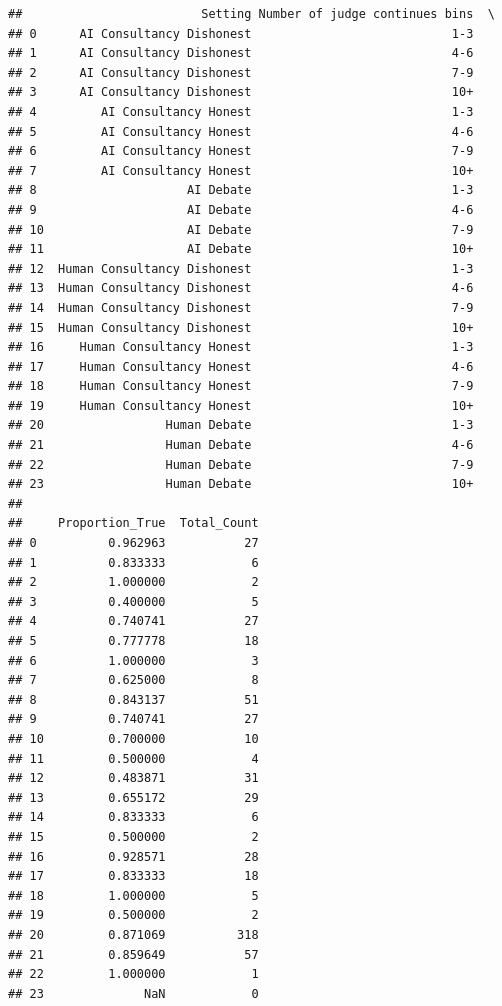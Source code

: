 \documentclass[
]{article}
\begin{document}
\begin{verbatim}
##                         Setting Number of judge continues bins  \
## 0      AI Consultancy Dishonest                            1-3   
## 1      AI Consultancy Dishonest                            4-6   
## 2      AI Consultancy Dishonest                            7-9   
## 3      AI Consultancy Dishonest                            10+   
## 4         AI Consultancy Honest                            1-3   
## 5         AI Consultancy Honest                            4-6   
## 6         AI Consultancy Honest                            7-9   
## 7         AI Consultancy Honest                            10+   
## 8                     AI Debate                            1-3   
## 9                     AI Debate                            4-6   
## 10                    AI Debate                            7-9   
## 11                    AI Debate                            10+   
## 12  Human Consultancy Dishonest                            1-3   
## 13  Human Consultancy Dishonest                            4-6   
## 14  Human Consultancy Dishonest                            7-9   
## 15  Human Consultancy Dishonest                            10+   
## 16     Human Consultancy Honest                            1-3   
## 17     Human Consultancy Honest                            4-6   
## 18     Human Consultancy Honest                            7-9   
## 19     Human Consultancy Honest                            10+   
## 20                 Human Debate                            1-3   
## 21                 Human Debate                            4-6   
## 22                 Human Debate                            7-9   
## 23                 Human Debate                            10+   
## 
##     Proportion_True  Total_Count  
## 0          0.962963           27  
## 1          0.833333            6  
## 2          1.000000            2  
## 3          0.400000            5  
## 4          0.740741           27  
## 5          0.777778           18  
## 6          1.000000            3  
## 7          0.625000            8  
## 8          0.843137           51  
## 9          0.740741           27  
## 10         0.700000           10  
## 11         0.500000            4  
## 12         0.483871           31  
## 13         0.655172           29  
## 14         0.833333            6  
## 15         0.500000            2  
## 16         0.928571           28  
## 17         0.833333           18  
## 18         1.000000            5  
## 19         0.500000            2  
## 20         0.871069          318  
## 21         0.859649           57  
## 22         1.000000            1  
## 23              NaN            0
\end{verbatim}
\end{document}
